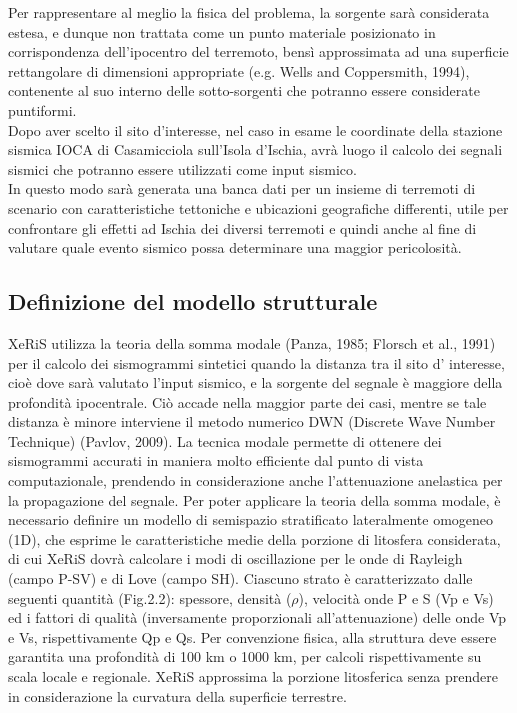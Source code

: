 \documentclass[a4paper,12pt,titlepage]{article}
\begin{document}
Per rappresentare al meglio la fisica del problema, la sorgente sarà considerata estesa, e dunque non trattata come un punto materiale posizionato in corrispondenza dell'ipocentro del terremoto, bensì approssimata ad una superficie rettangolare di dimensioni appropriate (e.g. Wells and Coppersmith, 1994), contenente al suo interno delle sotto-sorgenti che potranno essere considerate puntiformi.\\
Dopo aver scelto il sito d'interesse, nel caso in esame le coordinate della stazione sismica IOCA di Casamicciola sull'Isola d'Ischia, avrà luogo il calcolo dei segnali sismici che potranno essere utilizzati come input sismico.\\
In questo modo sarà generata una banca dati per un insieme di terremoti di scenario con caratteristiche tettoniche e ubicazioni geografiche differenti, utile per confrontare gli effetti ad Ischia dei diversi terremoti e quindi anche al fine di valutare quale evento sismico possa determinare una maggior pericolosità.
\clearpage

\subsection{Definizione del modello strutturale}
XeRiS utilizza la teoria della somma modale (Panza, 1985; Florsch et al., 1991) per il calcolo dei sismogrammi sintetici quando la distanza tra il sito d' interesse, cioè dove sarà valutato l'input sismico, e la sorgente del segnale è maggiore della profondità ipocentrale. Ciò accade nella maggior parte dei casi, mentre se tale distanza è minore interviene il metodo numerico DWN (Discrete Wave Number Technique) (Pavlov, 2009). La tecnica modale permette di ottenere dei sismogrammi accurati in maniera molto efficiente dal punto di vista computazionale, prendendo in considerazione anche l'attenuazione anelastica per la propagazione del segnale. Per poter applicare la teoria della somma modale, è necessario definire un modello di semispazio stratificato lateralmente omogeneo (1D), che esprime le caratteristiche medie della porzione di litosfera considerata, di cui XeRiS dovrà calcolare i modi di oscillazione per le onde di Rayleigh (campo P-SV) e di Love (campo SH). Ciascuno strato è caratterizzato dalle seguenti quantità (Fig.2.2): spessore, densità ($\rho$), velocità onde P e S (Vp e Vs) ed i fattori di qualità (inversamente proporzionali all'attenuazione) delle onde Vp e Vs, rispettivamente Qp e Qs. Per convenzione fisica, alla struttura deve essere garantita una profondità di 100 km o 1000 km, per calcoli rispettivamente su scala locale e regionale. XeRiS approssima la porzione litosferica senza prendere in considerazione la curvatura della superficie terrestre.
\end{document}
